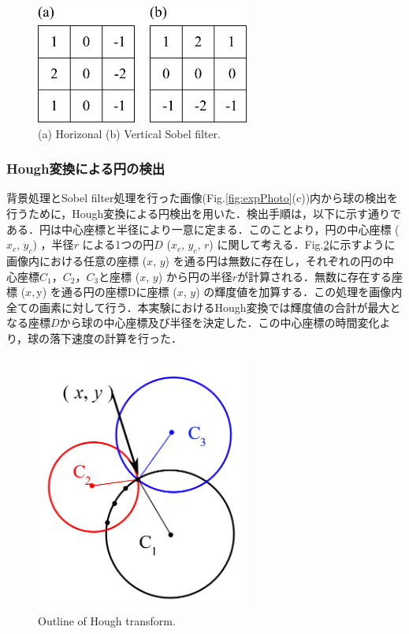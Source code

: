 \begin{figure}[h]
    \centering
    \includegraphics[width=7.0cm,clip]{2-Methods/sobel-filter.png}
    \caption{(a) Horizonal (b) Vertical Sobel filter.}
    \label{fig:sobel}
\end{figure}

\clearpage

\subsubsection{Hough変換による円の検出}
背景処理とSobel filter処理を行った画像(Fig.\ref{fig:expPhoto}(c))内から球の検出を行うために，Hough変換による円検出を用いた．検出手順は，以下に示す通りである．円は中心座標と半径により一意に定まる．このことより，円の中心座標 ($x_c$, $y_c$) ，半径$r$ による1つの円$D$ ($x_c$, $y_c$, $r$) に関して考える．Fig.\ref{fig:hough}に示すように画像内における任意の座標 ($x$, $y$) を通る円は無数に存在し，それぞれの円の中心座標$C_1$，$C_2$，$C_3$と座標 ($x$, $y$) から円の半径$r$が計算される．無数に存在する座標 ($x, $y) を通る円の座標Dに座標 ($x$, $y$) の輝度値を加算する．この処理を画像内全ての画素に対して行う．本実験におけるHough変換では輝度値の合計が最大となる座標$D$から球の中心座標及び半径を決定した．この中心座標の時間変化より，球の落下速度の計算を行った．

\begin{figure}[h]
    \centering
    \includegraphics[width=7.0cm,clip]{2-Methods/hough.PNG}
    \caption{Outline of Hough transform.}
    \label{fig:hough}
\end{figure}
